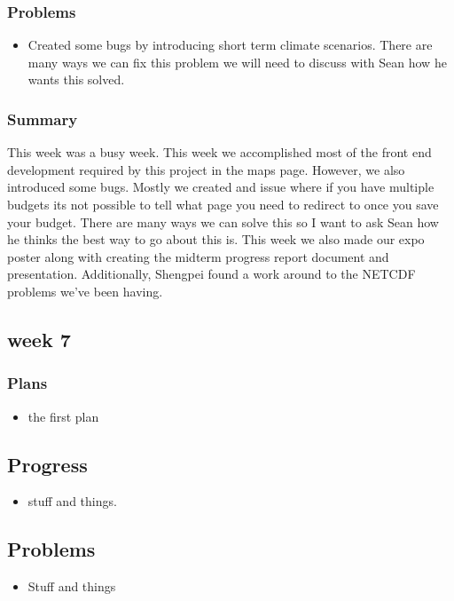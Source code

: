 \documentclass[onecolumn, draftclsnofoot,10pt, compsoc]{article}
\begin{document}
			\subsubsection{Problems}
				\begin{itemize}
					\item Created some bugs by introducing short term climate scenarios.
						\subitem There are many ways we can fix this problem we will need to discuss with Sean how he wants this solved.
				\end{itemize}
			\subsubsection{Summary} This week was a busy week. This week we accomplished most of the front end development required by this project in the maps page. However, we also introduced some bugs. Mostly we created and issue where if you have multiple budgets its not possible to tell what page you need to redirect to once you save your budget. There are many ways we can solve this so I want to ask Sean how he thinks the best way to go about this is. This week we also made our expo poster along with creating the midterm progress report document and presentation. Additionally, Shengpei found a work around to the NETCDF problems we've been having.\\
			
		\subsection{week 7}
			\subsubsection{Plans}
				\begin{itemize}
					\item the first plan
				\end{itemize}
			\subsection{Progress}
				\begin{itemize}
					\item stuff and things.
				\end{itemize}
			\subsection{Problems}
				\begin{itemize}
					\item Stuff and things
				\end{itemize}
\end{document}
